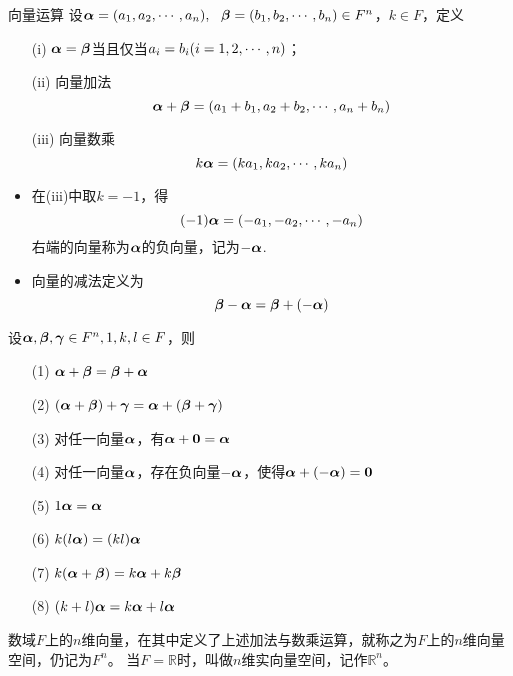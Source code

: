 \begin{frame}
\begin{dingyi}{向量运算}
  设$\boldsymbol{\alpha}=(a_1,a_2,\cdots,a_n),~~\boldsymbol{\beta}=(b_1,b_2,\cdots,b_n)\in F^n$，$k\in F$，定义
  \begin{enumerate}
  \item[(i)]
    $\boldsymbol{\alpha}=\boldsymbol{\beta}$当且仅当$a_i=b_i(i=1,2,\cdots,n)$；
  \item[(ii)] 向量加法
    $$
    \boldsymbol{\alpha}+\boldsymbol{\beta}=(a_1+b_1,a_2+b_2,\cdots,a_n+b_n)
    $$
  \item[(iii)] 向量数乘
    $$
    k\boldsymbol{\alpha}=(ka_1,ka_2,\cdots,ka_n)
    $$
  \end{enumerate}
\end{dingyi}

\begin{itemize}
\item 在(iii)中取$k=-1$，得
  $$
  (-1)\boldsymbol{\alpha} = (-a_1,-a_2,\cdots,-a_n)
  $$
  右端的向量称为$\boldsymbol{\alpha}$的负向量，记为$-\boldsymbol{\alpha}$. 
\item 向量的减法定义为
  $$
  \boldsymbol{\beta}-\boldsymbol{\alpha} = \boldsymbol{\beta} + (-\boldsymbol{\alpha})
  $$
\end{itemize}
\end{frame}

\begin{frame}
\begin{dingyi}
  设$\boldsymbol{\alpha},\boldsymbol{\beta},\boldsymbol{\gamma}\in F^n, 1,k,l\in F$，则
  \begin{itemize}
  \item[(1)] $\boldsymbol{\alpha}+\boldsymbol{\beta}=\boldsymbol{\beta}+\boldsymbol{\alpha}$
  \item[(2)] $(\boldsymbol{\alpha}+\boldsymbol{\beta})+\boldsymbol{\gamma}=\boldsymbol{\alpha}+(\boldsymbol{\beta}+\boldsymbol{\gamma})$
  \item[(3)] 对任一向量$\boldsymbol{\alpha}$，有$\alphabd+\M0=\alphabd$
  \item[(4)] 对任一向量$\boldsymbol{\alpha}$，存在负向量$-\boldsymbol{\alpha}$，使得$\alphabd+(-\alphabd)=\M0$
  \item[(5)] $1\boldsymbol{\alpha}=\boldsymbol{\alpha}$
  \item[(6)] $k(l\boldsymbol{\alpha})=(kl)\boldsymbol{\alpha}$
  \item[(7)] $k(\boldsymbol{\alpha}+\boldsymbol{\beta})=k\boldsymbol{\alpha}+k\boldsymbol{\beta}$
  \item[(8)] $(k+l)\boldsymbol{\alpha}=k\boldsymbol{\alpha}+l\boldsymbol{\alpha}$
  \end{itemize}
\end{dingyi}
\end{frame}

\begin{frame}
\begin{dingyi}[向量空间]
  数域$F$上的$n$维向量，在其中定义了上述加法与数乘运算，就称之为$F$上的$n$维向量空间，仍记为$F^n$。
  当$F=\mathbb R$时，叫做$n$维实向量空间，记作$\mathbb R^n$。
\end{dingyi}
\end{frame}

